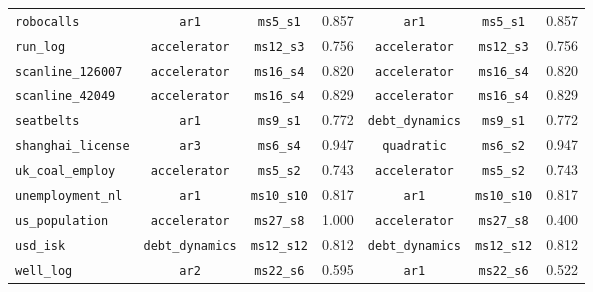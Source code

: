 \begin{table}[htbp]
{\begin{tabular}{lcccccc}
\texttt{robocalls} & \texttt{ar1} & \texttt{ms5\_s1} & 0.857 & \texttt{ar1} & \texttt{ms5\_s1} & 0.857\\
\texttt{run\_log} & \texttt{accelerator} & \texttt{ms12\_s3} & 0.756 & \texttt{accelerator} & \texttt{ms12\_s3} & 0.756\\
\texttt{scanline\_126007} & \texttt{accelerator} & \texttt{ms16\_s4} & 0.820 & \texttt{accelerator} & \texttt{ms16\_s4} & 0.820\\
\texttt{scanline\_42049} & \texttt{accelerator} & \texttt{ms16\_s4} & 0.829 & \texttt{accelerator} & \texttt{ms16\_s4} & 0.829\\
\texttt{seatbelts} & \texttt{ar1} & \texttt{ms9\_s1} & 0.772 & \texttt{debt\_dynamics} & \texttt{ms9\_s1} & 0.772\\
\texttt{shanghai\_license} & \texttt{ar3} & \texttt{ms6\_s4} & 0.947 & \texttt{quadratic} & \texttt{ms6\_s2} & 0.947\\
\texttt{uk\_coal\_employ} & \texttt{accelerator} & \texttt{ms5\_s2} & 0.743 & \texttt{accelerator} & \texttt{ms5\_s2} & 0.743\\
\texttt{unemployment\_nl} & \texttt{ar1} & \texttt{ms10\_s10} & 0.817 & \texttt{ar1} & \texttt{ms10\_s10} & 0.817\\
\texttt{us\_population} & \texttt{accelerator} & \texttt{ms27\_s8} & 1.000 & \texttt{accelerator} & \texttt{ms27\_s8} & 0.400\\
\texttt{usd\_isk} & \texttt{debt\_dynamics} & \texttt{ms12\_s12} & 0.812 & \texttt{debt\_dynamics} & \texttt{ms12\_s12} & 0.812\\
\texttt{well\_log} & \texttt{ar2} & \texttt{ms22\_s6} & 0.595 & \texttt{ar1} & \texttt{ms22\_s6} & 0.522\\
\bottomrule
\end{tabular}%
}
\end{table}
